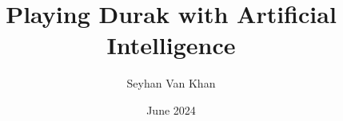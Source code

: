 \documentclass[a4paper, 12pt]{report}
\begin{document}

\title{Playing Durak with Artificial Intelligence}
\author{Seyhan Van Khan}
\date{June 2024}
\maketitle
\end{document}
